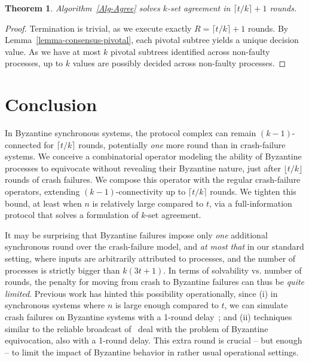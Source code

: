 \documentclass[11pt]{article}
\newtheorem{theorem}{Theorem}[section]
\begin{document}
\begin{theorem}
\label{theorem-ksetcorrectness}
Algorithm~\ref{Alg-Agree} solves $k$-set agreement
in $\lceil t/k \rceil + 1$ rounds.
\end{theorem}
\begin{proof}
Termination is trivial,
as we execute exactly $R = \lceil t/k \rceil + 1$ rounds. 
By Lemma~\ref{lemma-consensus-pivotal},
each pivotal subtree yields a unique decision value.
As we have at most $k$ pivotal subtrees identified across non-faulty processes,
up to $k$ values are possibly decided across non-faulty processes.
\end{proof}

\section{Conclusion}

In Byzantine synchronous systems,
the protocol complex can remain $(k - 1)$-connected for $\lceil t/k \rceil$ rounds,
potentially \emph{one} more round than in crash-failure systems.
We conceive a combinatorial operator modeling the ability of Byzantine processes
to equivocate without revealing their Byzantine nature,
just after $\lfloor t/k \rfloor$ rounds of crash failures.
We compose this operator with the regular crash-failure operators,
extending $(k - 1)$-connectivity up to $\lceil t/k \rceil$ rounds.
We tighten this bound,
at least when $n$ is relatively large compared to $t$,
via a full-information protocol
that solves a formulation of $k$-set agreement.

It may be surprising that Byzantine failures
impose only \emph{one} additional synchronous round over the crash-failure model,
and \emph{at most that} in our standard setting,
where inputs are arbitrarily attributed to processes,
and the number of processes is strictly bigger than $k(3t + 1)$.
In terms of solvability vs. number of rounds,
the penalty for moving from crash to Byzantine failures
can thus be \emph{quite limited}.
Previous work has hinted this possibility operationally, since
(i) in synchronous systems where $n$ is large enough compared to $t$,
we can simulate crash failures on Byzantine systems with a 1-round delay~\cite{BazziNeiger01};
and (ii) techniques similar to the reliable broadcast of~\cite{Bracha,SriTouRB}
deal with the problem of Byzantine equivocation,
also with a 1-round delay.
This extra round is crucial -- but enough -- to limit the impact of Byzantine behavior
in rather usual operational settings.
\end{document}
